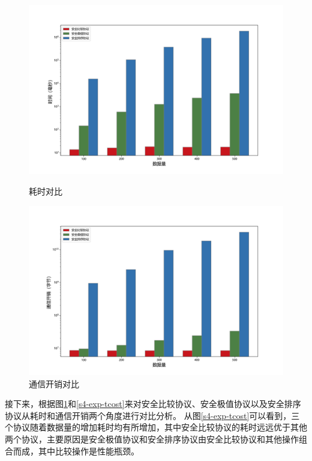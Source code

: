 \begin{figure}[htbp] %
	\begin{minipage}[t]{0.5\linewidth}
		\includegraphics[width=\linewidth]{img/timecompare.png}
		\caption{耗时对比}
		\label{s4-exp-tcost}
	\end{minipage}%
	\hfill%
	\begin{minipage}[t]{0.5\linewidth}
		\includegraphics[width=\linewidth]{img/commcompare.png}
		\caption{通信开销对比}
		\label{s4-exp-ccost}
	\end{minipage}
\end{figure}

接下来，根据图\ref{s4-exp-ccost}和\ref{s4-exp-tcost}来对安全比较协议、安全极值协议以及安全排序协议从耗时和通信开销两个角度进行对比分析。
从图\ref{s4-exp-tcost}可以看到，三个协议随着数据量的增加耗时均有所增加，其中安全比较协议的耗时远远优于其他两个协议，主要原因是安全极值协议和安全排序协议由安全比较协议和其他操作组合而成，其中比较操作是性能瓶颈。

